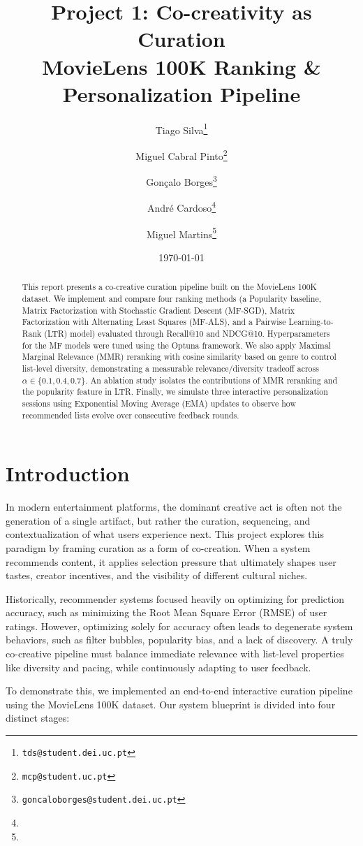 \documentclass[11pt]{article}
\title{\textbf{Project 1: Co-creativity as Curation} \\
\large MovieLens 100K Ranking \& Personalization Pipeline}
\author{
Tiago Silva\thanks{\texttt{tds@student.dei.uc.pt}}
\and
Miguel Cabral Pinto\thanks{\texttt{mcp@student.uc.pt}}
\and
Gonçalo Borges\thanks{\texttt{goncaloborges@student.dei.uc.pt}}
\and
André Cardoso\thanks{\texttt{}}
\and
Miguel Martins\thanks{\texttt{}}
}
\date{\today}
\begin{document}
\maketitle

\begin{abstract}
\noindent This report presents a co-creative curation pipeline built on the MovieLens 100K dataset. We implement and compare four ranking methods (a Popularity baseline, Matrix Factorization with Stochastic Gradient Descent (MF-SGD), Matrix Factorization with Alternating Least Squares (MF-ALS), and a Pairwise Learning-to-Rank (LTR) model) evaluated through Recall@10 and NDCG@10. Hyperparameters for the MF models were tuned using the Optuna framework. We also apply Maximal Marginal Relevance (MMR) reranking with cosine similarity based on genre to control list-level diversity, demonstrating a measurable relevance/diversity tradeoff across $\alpha \in \{0.1, 0.4, 0.7\}$. An ablation study isolates the contributions of MMR reranking and the popularity feature in LTR. Finally, we simulate three interactive personalization sessions using Exponential Moving Average (EMA) updates to observe how recommended lists evolve over consecutive feedback rounds.
\end{abstract}

\section{Introduction}
\label{sec:introduction}

\noindent In modern entertainment platforms, the dominant creative act is often not the generation of a single artifact, but rather the curation, sequencing, and contextualization of what users experience next. This project explores this paradigm by framing curation as a form of co-creation. When a system recommends content, it applies selection pressure that ultimately shapes user tastes, creator incentives, and the visibility of different cultural niches.

\noindent Historically, recommender systems focused heavily on optimizing for prediction accuracy, such as minimizing the Root Mean Square Error (RMSE) of user ratings. However, optimizing solely for accuracy often leads to degenerate system behaviors, such as filter bubbles, popularity bias, and a lack of discovery. A truly co-creative pipeline must balance immediate relevance with list-level properties like diversity and pacing, while continuously adapting to user feedback.

\noindent To demonstrate this, we implemented an end-to-end interactive curation pipeline using the MovieLens 100K dataset. Our system blueprint is divided into four distinct stages:
\end{document}

